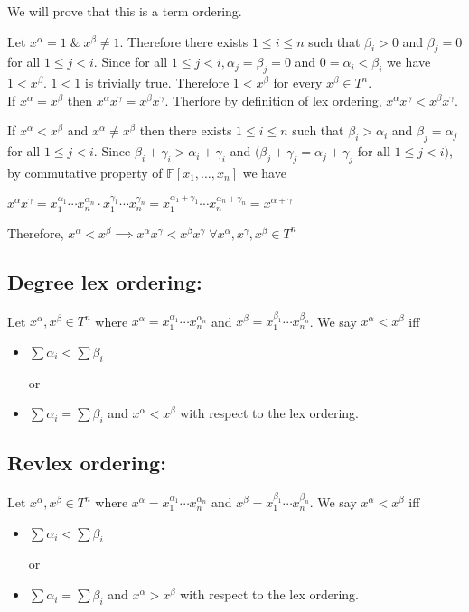 \begin{definition}
We will prove that this is a term ordering.

Let $x^{\alpha}=1\;\&\;x^{\beta}\neq1$. Therefore
there exists $1\leq i\leq n$ such that $\beta_{i}>0$ and $\beta_{j}=0$ for all $1\leq j<i$. Since 
for all $1\leq j<i, \alpha_{j}=\beta_{j}=0$ and
$0=\alpha_{i}<\beta_{i}$ we have $1<x^{\beta}$.
$1<1$ is trivially true. Therefore
$1<x^{\beta}$ for every $x^{\beta}\in T^n$.\\


If $x^{\alpha}=x^{\beta}$ then $x^{\alpha}x^{\gamma}=x^{\beta}x^{\gamma}$. Therfore by definition of lex ordering, $x^{\alpha}x^{\gamma}<x^{\beta}x^{\gamma}$.

If $x^{\alpha}<x^{\beta}$ and $x^{\alpha}\neq x^{\beta}$ then there exists $1\leq i\leq n$ such that $\beta_{i}>\alpha_{i}$ and $\beta_{j}=\alpha_{j}$ for all $1\leq j<i$. Since $\beta_{i}+\gamma_{i}>\alpha_{i}+\gamma_{i}$ and $(\beta_{j}+\gamma_{j}=\alpha_{j}+\gamma_{j}$ for all $1\leq j<i)$, by commutative property of $\mathbb{F}[x_{1},\ldots,x_{n}]$ we have
\begin{center}
$x^{\alpha}x^{\gamma}=x_{1}^{\alpha_{1}}\cdots x_{n}^{\alpha_{n}}\cdot x_{1}^{\gamma_{1}}\cdots x_{n}^{\gamma_{n}}=x_{1}^{\alpha_{1}+\gamma_{1}}\cdots x_{n}^{\alpha_{n}+\gamma_{n}}=x^{\alpha+\gamma}$
\end{center}
Therefore,
$x^{\alpha}<x^{\beta}\implies x^{\alpha}x^{\gamma}<x^{\beta}x^{\gamma}\; \forall x^{\alpha},x^{\gamma},x^{\beta}\in T^{n}$


\subsection*{Degree lex ordering:}
Let $x^{\alpha},x^{\beta} \in T^{n}$ where
$x^{\alpha}=x_{1}^{\alpha_{1}}\cdots x_{n}^{\alpha_{n}}$ and $x^{\beta}=x_{1}^{\beta_{1}}\cdots x_{n}^{\beta_{n}}$. We say $x^{\alpha}<x^{\beta}$ iff 
\begin{itemize}
\item $\sum\alpha_{i}<\sum\beta_{i}$ 
\item [or]
\item $\sum\alpha_{i}=\sum\beta_{i}$ and $x^{\alpha}<x^{\beta}$ with respect to the lex ordering. 
\end{itemize}

\subsection*{Revlex ordering:}
Let $x^{\alpha},x^{\beta} \in T^{n}$ where
$x^{\alpha}=x_{1}^{\alpha_{1}}\cdots x_{n}^{\alpha_{n}}$ and $x^{\beta}=x_{1}^{\beta_{1}}\cdots x_{n}^{\beta_{n}}$. We say 
$x^{\alpha}<x^{\beta}$ iff
\begin{itemize}
\item $\sum\alpha_{i}<\sum\beta_{i}$ 
\item [or]
\item  $\sum\alpha_{i}=\sum\beta_{i}$ and $x^{\alpha}>x^{\beta}$ with respect to the lex ordering. 
\end{itemize}


\end{definition}
